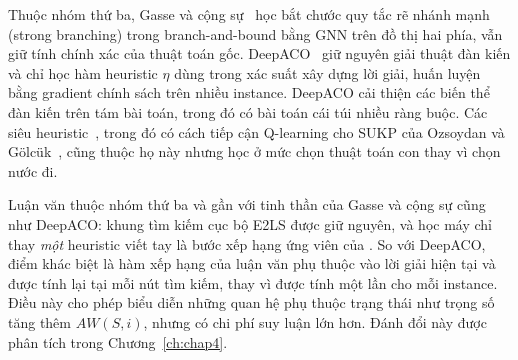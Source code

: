 Thuộc nhóm thứ ba, Gasse và cộng sự~\cite{Gasse2019} học bắt chước quy tắc rẽ nhánh mạnh (strong branching) trong branch-and-bound bằng GNN trên đồ thị hai phía, vẫn giữ tính chính xác của thuật toán gốc. DeepACO~\cite{Ye2023DeepACO} giữ nguyên giải thuật đàn kiến và chỉ học hàm heuristic $\eta$ dùng trong xác suất xây dựng lời giải, huấn luyện bằng gradient chính sách trên nhiều instance. DeepACO cải thiện các biến thể đàn kiến trên tám bài toán, trong đó có bài toán cái túi nhiều ràng buộc. Các siêu heuristic~\cite{Burke2013}, trong đó có cách tiếp cận Q-learning cho SUKP của Ozsoydan và Gölcük~\cite{Ozsoydan2023}, cũng thuộc họ này nhưng học ở mức chọn thuật toán con thay vì chọn nước đi.

Luận văn thuộc nhóm thứ ba và gần với tinh thần của Gasse và cộng sự cũng như DeepACO: khung tìm kiếm cục bộ E2LS được giữ nguyên, và học máy chỉ thay \emph{một} heuristic viết tay là bước xếp hạng ứng viên của \addstar. So với DeepACO, điểm khác biệt là hàm xếp hạng của luận văn phụ thuộc vào lời giải hiện tại và được tính lại tại mỗi nút tìm kiếm, thay vì được tính một lần cho mỗi instance. Điều này cho phép biểu diễn những quan hệ phụ thuộc trạng thái như trọng số tăng thêm $AW(S,i)$, nhưng có chi phí suy luận lớn hơn. Đánh đổi này được phân tích trong Chương~\ref{ch:chap4}.
